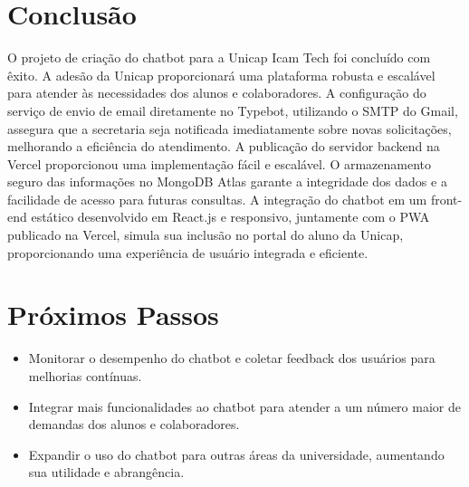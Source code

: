 \documentclass[12pt,a4paper]{article} %
\begin{document}
\section{Conclusão}
O projeto de criação do chatbot para a Unicap Icam Tech foi concluído com êxito. A adesão da Unicap proporcionará uma plataforma robusta e escalável para atender às necessidades dos alunos e colaboradores. A configuração do serviço de envio de email diretamente no Typebot, utilizando o SMTP do Gmail, assegura que a secretaria seja notificada imediatamente sobre novas solicitações, melhorando a eficiência do atendimento. A publicação do servidor backend na Vercel proporcionou uma implementação fácil e escalável. O armazenamento seguro das informações no MongoDB Atlas garante a integridade dos dados e a facilidade de acesso para futuras consultas. A integração do chatbot em um front-end estático desenvolvido em React.js e responsivo, juntamente com o PWA publicado na Vercel, simula sua inclusão no portal do aluno da Unicap, proporcionando uma experiência de usuário integrada e eficiente.

\section{Próximos Passos}

\begin{itemize}
    \item Monitorar o desempenho do chatbot e coletar feedback dos usuários para melhorias contínuas.
    \item Integrar mais funcionalidades ao chatbot para atender a um número maior de demandas dos alunos e colaboradores.
    \item Expandir o uso do chatbot para outras áreas da universidade, aumentando sua utilidade e abrangência.
\end{itemize}
\end{document}
